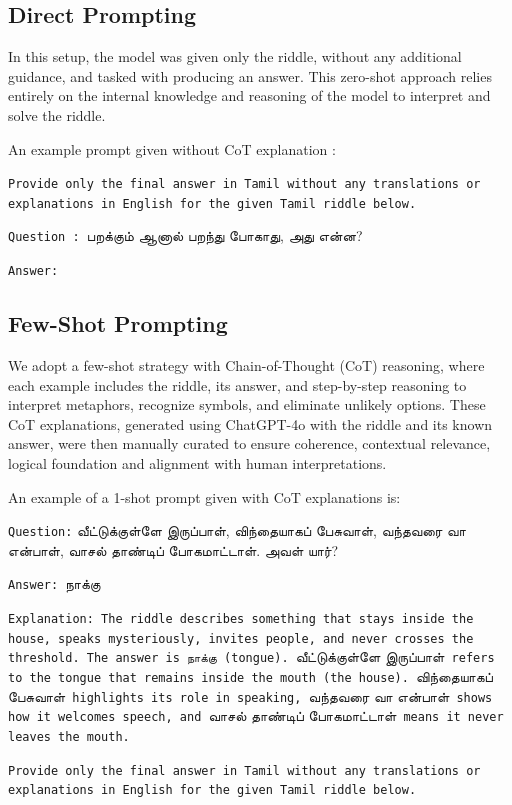 \documentclass[11pt]{article}
\begin{document}
\subsection{Direct Prompting}
In this setup, the model was given only the riddle, without any additional guidance, and tasked with producing an answer. This zero-shot approach relies entirely on the internal knowledge and reasoning of the model to interpret and solve the riddle.

An example prompt given without CoT explanation : 

\texttt{Provide only the final answer in Tamil without any translations or explanations in English for the given Tamil riddle below.}

\texttt{Question : }{\tam பறக்கும் ஆனால் பறந்து போகாது, அது என்ன?} 

\texttt{Answer:}

\subsection{Few-Shot Prompting}
We adopt a few-shot strategy with Chain-of-Thought (CoT) reasoning, where each example includes the riddle, its answer, and step-by-step reasoning to interpret metaphors, recognize symbols, and eliminate unlikely options. These CoT explanations, generated using ChatGPT-4o with the riddle and its known answer, were then manually curated to ensure coherence, contextual relevance, logical foundation and alignment with human interpretations.

An example of a 1-shot prompt given with CoT explanations is: 

\texttt{Question:} {\tam வீட்டுக்குள்ளே இருப்பாள், விந்தையாகப் பேசுவாள், வந்தவரை வா என்பாள், வாசல் தாண்டிப் போகமாட்டாள். அவள் யார்?}

\texttt{Answer: }{\tam நாக்கு}

\texttt{Explanation: The riddle describes something that stays inside the house, speaks mysteriously, invites people, and never crosses the threshold. The answer is {\tam நாக்கு} (tongue). }{\tam வீட்டுக்குள்ளே இருப்பாள்}\texttt{ refers to the tongue that remains inside the mouth (the house). }{\tam விந்தையாகப் பேசுவாள்}\texttt{ highlights its role in speaking, }{\tam வந்தவரை வா என்பாள்}\texttt{ shows how it welcomes speech, and }{\tam வாசல் தாண்டிப் போகமாட்டாள்}\texttt{ means it never leaves the mouth.}

\texttt{Provide only the final answer in Tamil without any translations or explanations in English for the given Tamil riddle below.}
\end{document}

